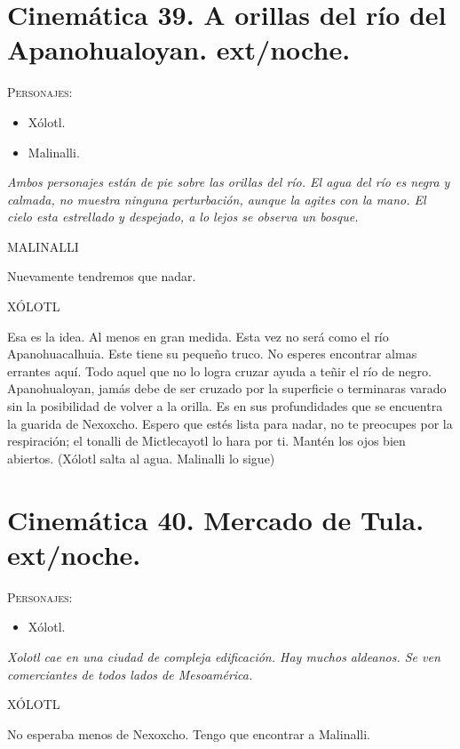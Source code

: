 \documentclass[11pt,letterpaper]{article}
\begin{document}
\section{Cinemática 39. A orillas del río del Apanohualoyan. ext/noche.}
 \textsc{Personajes}:
 \begin{itemize}
 \item Xólotl.
 \item Malinalli.
 \end{itemize}
\textit{Ambos personajes están de pie sobre las orillas del río. El agua del río es negra y calmada, no muestra ninguna perturbación, aunque la agites con la mano. El cielo esta estrellado y despejado, a lo lejos se observa un bosque.}
\begin{center}
MALINALLI
\\
\par
Nuevamente tendremos que nadar.
\\
\par
XÓLOTL
\\
\par
Esa es la idea. Al menos en gran medida. Esta vez no será como el río Apanohuacalhuia. Este tiene su pequeño truco. No esperes encontrar almas errantes aquí. Todo aquel que no lo logra cruzar ayuda a teñir el río de negro. Apanohualoyan, jamás debe de ser cruzado por la superficie o terminaras varado sin la posibilidad de volver a la orilla. Es en sus profundidades que se encuentra la guarida de Nexoxcho. Espero que estés lista para nadar, no te preocupes por la respiración; el tonalli de Mictlecayotl lo hara por ti. Mantén los ojos bien abiertos.
(Xólotl salta al agua. Malinalli lo sigue)
\end{center}


\section{Cinemática 40. Mercado de Tula.  ext/noche. }
 \textsc{Personajes}:
 \begin{itemize}
 \item Xólotl.
 \end{itemize}
\textit{Xolotl cae en una ciudad de compleja edificación. Hay muchos aldeanos. Se ven comerciantes de todos lados de Mesoamérica.}
\begin{center}
XÓLOTL
\\
\par
No esperaba menos de Nexoxcho. Tengo que encontrar a Malinalli.
\end{center}
 
\end{document}
